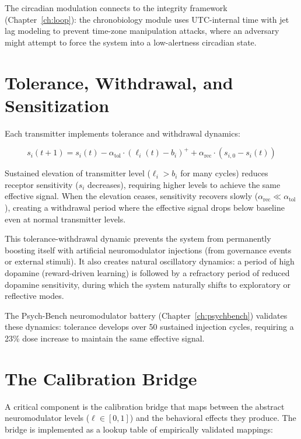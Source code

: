 \documentclass[12pt]{book}
\begin{document}
The circadian modulation connects to the integrity framework (Chapter~\ref{ch:loop}): the chronobiology module uses UTC-internal time with jet lag modeling to prevent time-zone manipulation attacks, where an adversary might attempt to force the system into a low-alertness circadian state.

\section{Tolerance, Withdrawal, and Sensitization}

Each transmitter implements tolerance and withdrawal dynamics:

\begin{equation}
s_i(t+1) = s_i(t) - \alpha_{\text{tol}} \cdot (\ell_i(t) - b_i)^+ + \alpha_{\text{rec}} \cdot (s_{i,0} - s_i(t))
\end{equation}

Sustained elevation of transmitter level ($\ell_i > b_i$ for many cycles) reduces receptor sensitivity ($s_i$ decreases), requiring higher levels to achieve the same effective signal. When the elevation ceases, sensitivity recovers slowly ($\alpha_{\text{rec}} \ll \alpha_{\text{tol}}$), creating a withdrawal period where the effective signal drops below baseline even at normal transmitter levels.

This tolerance-withdrawal dynamic prevents the system from permanently boosting itself with artificial neuromodulator injections (from governance events or external stimuli). It also creates natural oscillatory dynamics: a period of high dopamine (reward-driven learning) is followed by a refractory period of reduced dopamine sensitivity, during which the system naturally shifts to exploratory or reflective modes.

The Psych-Bench neuromodulator battery (Chapter~\ref{ch:psychbench}) validates these dynamics: tolerance develops over 50 sustained injection cycles, requiring a 23\% dose increase to maintain the same effective signal.

\section{The Calibration Bridge}

A critical component is the calibration bridge that maps between the abstract neuromodulator levels ($\ell \in [0, 1]$) and the behavioral effects they produce. The bridge is implemented as a lookup table of empirically validated mappings:
\end{document}
